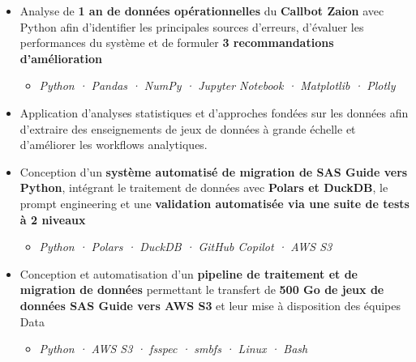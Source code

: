 \documentclass[10pt,english,french]{article}
\begin{document}
\vspace{-5pt}
\begin{itemize}[leftmargin=0.5cm, label=\textbullet, itemsep=0.05em]
    \item Analyse de \textbf{1 an de données opérationnelles} du \textbf{Callbot Zaion}
          avec Python afin d'identifier les principales sources d'erreurs,
          d'évaluer les performances du système et de formuler \textbf{3 recommandations d'amélioration}
          \begin{itemize}[leftmargin=0.25cm,label=\textendash,itemsep=0em,topsep=0.1em]
              \item \textit{\fontsize{10pt}{9pt}\selectfont Python · Pandas · NumPy · Jupyter Notebook · Matplotlib · Plotly}
          \end{itemize}

    \item Application d'analyses statistiques et d'approches fondées sur les données afin d'extraire des enseignements
          de jeux de données à grande échelle et d'améliorer les workflows analytiques.

    \item Conception d'un \textbf{système automatisé de migration de SAS Guide vers Python},
          intégrant le traitement de données avec \textbf{Polars et DuckDB},
          le prompt engineering et une \textbf{validation automatisée via une suite de tests à 2 niveaux}
          \begin{itemize}[leftmargin=0.25cm,label=\textendash,itemsep=0em,topsep=0.1em]
              \item \textit{\fontsize{10pt}{9pt}\selectfont Python · Polars · DuckDB · GitHub Copilot · AWS S3}
          \end{itemize}

    \item Conception et automatisation d'un \textbf{pipeline de traitement et de migration de données}
          permettant le transfert de \textbf{500\raisebox{0.20ex}{\small +} Go de jeux de données SAS Guide vers AWS S3}
          et leur mise à disposition des équipes Data
          \begin{itemize}[leftmargin=0.25cm,label=\textendash,itemsep=0em,topsep=0.1em]
              \item \textit{\fontsize{10pt}{9pt}\selectfont Python · AWS S3 · fsspec · smbfs · Linux · Bash}
          \end{itemize}



\end{itemize}
\end{document}
